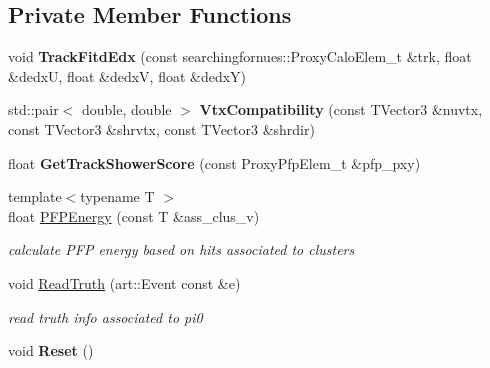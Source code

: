 \subsection*{Private Member Functions}
\begin{DoxyCompactItemize}
\item 
\hypertarget{classselection_1_1Pi0Selection_ae4c04e3355249e513c5096cc8381317c}{void {\bfseries Track\-Fitd\-Edx} (const searchingfornues\-::\-Proxy\-Calo\-Elem\-\_\-t \&trk, float \&dedx\-U, float \&dedx\-V, float \&dedx\-Y)}\label{classselection_1_1Pi0Selection_ae4c04e3355249e513c5096cc8381317c}

\item 
\hypertarget{classselection_1_1Pi0Selection_ad5dca90018e57209bfb37d07cfb352eb}{std\-::pair$<$ double, double $>$ {\bfseries Vtx\-Compatibility} (const T\-Vector3 \&nuvtx, const T\-Vector3 \&shrvtx, const T\-Vector3 \&shrdir)}\label{classselection_1_1Pi0Selection_ad5dca90018e57209bfb37d07cfb352eb}

\item 
\hypertarget{classselection_1_1Pi0Selection_a4605f0795f90e5bab0053b9798b53527}{float {\bfseries Get\-Track\-Shower\-Score} (const Proxy\-Pfp\-Elem\-\_\-t \&pfp\-\_\-pxy)}\label{classselection_1_1Pi0Selection_a4605f0795f90e5bab0053b9798b53527}

\item 
\hypertarget{classselection_1_1Pi0Selection_ada49763ed62a370288aa41eb67eb2c81}{{\footnotesize template$<$typename T $>$ }\\float \hyperlink{classselection_1_1Pi0Selection_ada49763ed62a370288aa41eb67eb2c81}{P\-F\-P\-Energy} (const T \&ass\-\_\-clus\-\_\-v)}\label{classselection_1_1Pi0Selection_ada49763ed62a370288aa41eb67eb2c81}

\begin{DoxyCompactList}\small\item\em calculate P\-F\-P energy based on hits associated to clusters \end{DoxyCompactList}\item 
\hypertarget{classselection_1_1Pi0Selection_aa56e851c27c26dd695a9a831ed693401}{void \hyperlink{classselection_1_1Pi0Selection_aa56e851c27c26dd695a9a831ed693401}{Read\-Truth} (art\-::\-Event const \&e)}\label{classselection_1_1Pi0Selection_aa56e851c27c26dd695a9a831ed693401}

\begin{DoxyCompactList}\small\item\em read truth info associated to pi0 \end{DoxyCompactList}\item 
\hypertarget{classselection_1_1Pi0Selection_a32a8080624253e6d72b7d55526d50a42}{void {\bfseries Reset} ()}\label{classselection_1_1Pi0Selection_a32a8080624253e6d72b7d55526d50a42}

\end{DoxyCompactItemize}
